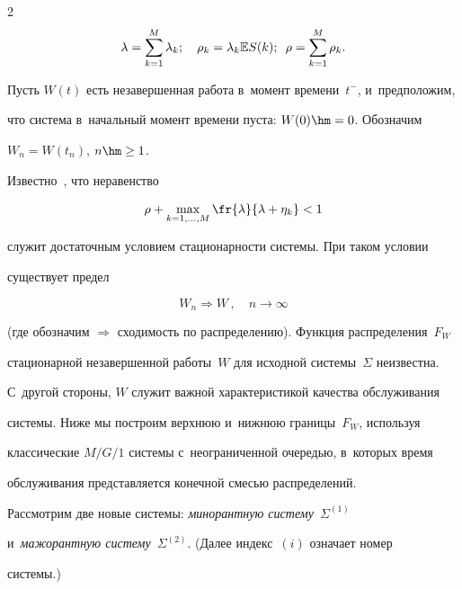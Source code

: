 \begin{multicols}{2}
\begin{equation*}


\lambda=\sum\limits_{k=1}^M\lambda_k ;\ \ \ \rho_k=\lambda_k\mathbb{E} S{(k)}; \enskip 


\rho=\sum\limits_{k=1}^M \rho_k.


\end{equation*}


Пусть $W(t)$ есть незавершенная работа в~момент времени~$t^-$, и~предположим, 


что система в~начальный момент времени пуста: $W(0)\hm=0$. Обозначим 


$W_n=W(t_n)$, $n\hm\ge1$.


Известно~\cite{Morozov2019}, что неравенство


 \begin{equation}


 \label{stability}


 \rho + \max\limits_{k=1,\ldots, M} \fr{\lambda}{\lambda+\eta_k} < 1


 \end{equation}


служит достаточным условием стационарности сис\-те\-мы.  При  таком условии 


существует  предел


$$


W_n \Rightarrow W\,,\quad n\to\infty


$$


(где обозначим $\Rightarrow$ схо\-ди\-мость по распределению). Функция распределения~$F_W$ 


стационарной незавершенной работы~$W$ для исходной сис\-те\-мы~$\Sigma$ неизвестна. 


С~другой стороны, $W$ служит важной характеристикой качества обслуживания 


сис\-те\-мы. Ниже мы построим верхнюю и~нижнюю границы~$F_W$, используя 


классические  $M/G/1$ сис\-те\-мы с~неограниченной оче\-редью, в~которых время 


обслуживания пред\-став\-ля\-ет\-ся конечной смесью распределений.








Рассмотрим две новые системы: \textit{минорантную сис\-те\-му}~$\Sigma^{(1)}$ 


и~\textit{мажорантную сис\-те\-му}~$\Sigma^{(2)}$. (Далее индекс~$(i)$ означает номер 


сис\-те\-мы.)



\end{multicols}
